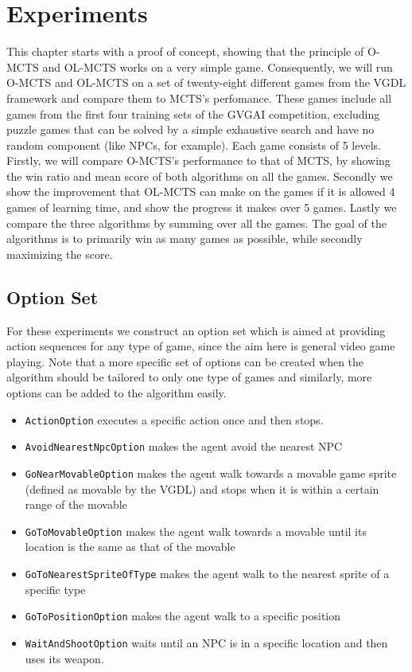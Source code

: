 \chapter{Experiments}
\label{sec:experiments}
This chapter starts with a proof of concept, showing that the principle of
O-MCTS and OL-MCTS works on a very simple game. Consequently, we will run O-MCTS
and OL-MCTS on a set of twenty-eight different games from the VGDL framework and
compare them to MCTS's perfomance.  These games include all games from the first
four training sets of the GVGAI competition, excluding puzzle games that can be
solved by a simple exhaustive search and have no random component (like NPCs,
for example). Each game consists of 5 levels. Firstly, we will compare O-MCTS's
performance to that of MCTS, by showing the win ratio and mean score of both
algorithms on all the games.  Secondly we show the improvement that OL-MCTS can
make on the games if it is allowed 4 games of learning time, and show the
progress it makes over 5 games.  Lastly we compare the three algorithms by
summing over all the games.  The goal of the algorithms is to primarily win as
many games as possible, while secondly maximizing the score. 

\section{Option Set}
For these experiments we construct an option set which is aimed at providing
action sequences for any type of game, since the aim here is general video game
playing. Note that a more specific set of options can be created when the
algorithm should be tailored to only one type of games and similarly, more
options can be added to the algorithm easily.

\begin{itemize}[noitemsep]
	\item \texttt{ActionOption} executes a specific action once and then
		stops.
	\item \texttt{AvoidNearestNpcOption} makes the agent avoid the nearest NPC
	\item \texttt{GoNearMovableOption} makes the agent walk towards a
		movable game sprite (defined as movable by the VGDL) and stops when it
		is within a certain range of the movable
	\item \texttt{GoToMovableOption} makes the agent walk towards a
		movable until its location is the same as that of the movable
	\item \texttt{GoToNearestSpriteOfType} makes the agent walk to the nearest sprite of
		a specific type
	\item \texttt{GoToPositionOption} makes the agent walk to a specific position
	\item \texttt{WaitAndShootOption} waits until an NPC is in a specific location and
		then uses its weapon.
\end{itemize}

